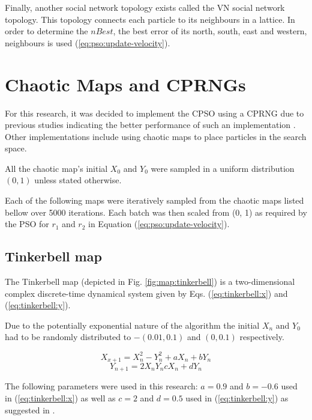 \documentclass[conference]{IEEEtran}
\begin{document}
    Finally, another social network topology exists called the \ac{VN} social network topology. This topology connects each particle to its neighbours in a lattice\cite{vanwyk:overfitting-psoffnn}. In order to determine the $ nBest $, the best error of its north, south, east and western, neighbours is used (\ref{eq:pso:update-velocity}).
    
    
\section{Chaotic Maps and \ac{CPRNG}s}
	For this research, it was decided to implement the \ac{CPSO} using a \ac{CPRNG} due to previous studies indicating the better performance of such an implementation \cite{pluhacek:cpso-cprng-imp}\cite{pluhacek:cpso-esb-chaotic}. Other implementations include using chaotic maps to place particles in the search space.
	
	All the chaotic map's initial $ X_0 $ and $ Y_0 $ were sampled in a uniform distribution $ (0, 1) $ unless stated otherwise.
	
	Each of the following maps were iteratively sampled from the chaotic maps listed bellow over 5000 iterations. Each batch was then scaled from (0, 1) as required by the \ac{PSO} for $ r_1 $ and $ r_2 $ in Equation (\ref{eq:pso:update-velocity}).
	
	\subsection{Tinkerbell map}
	
	The Tinkerbell map (depicted in Fig. \ref{fig:map:tinkerbell}) is a two-dimensional complex discrete-time dynamical system given by Eqs. (\ref{eq:tinkerbell:x}) and (\ref{eq:tinkerbell:y}).
	
	Due to the potentially exponential nature of the algorithm the initial $ X_n $ and $ Y_0 $ had to be randomly distributed to $ -(0.01, 0.1) $ and $ (0, 0.1) $ respectively.
	
	\begin{equation} \label{eq:tinkerbell:x}
	X_{x+1} = X_n^2 - Y_n^2 + aX_n + bY_n
	\end{equation}
	\begin{equation} \label{eq:tinkerbell:y}
	Y_{n+1} = 2X_nY_n cX_n + dY_n
	\end{equation}

    \noindent The following parameters were used in this research: $ a = 0.9 $ and $ b = -0.6 $ used in (\ref{eq:tinkerbell:x}) as well as $ c = 2 $ and $ d = 0.5 $ used in (\ref{eq:tinkerbell:y}) as suggested in \cite{pluhacek:cpso-cprng-imp}.
    \vspace{5mm}
    
\end{document}
